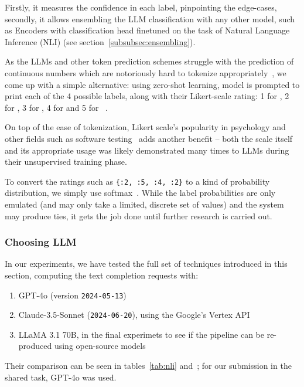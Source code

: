 Firstly, it measures the confidence in each label, pinpointing the edge-cases, secondly, it allows ensembling the LLM classification with any other model, such as Encoders with classification head finetuned on the task of Natural Language Inference (NLI) (see section~\ref{subsubsec:ensembling}).

As the LLMs and other token prediction schemes struggle with the prediction of continuous numbers which are notoriously hard to tokenize appropriately~\cite{golkar2023xvalcontinuousnumberencoding}, we come up with a simple alternative: using zero-shot learning, model is prompted to print each of the 4 possible labels, along with their Likert-scale rating: 1 for , 2 for , 3 for , 4 for  and 5 for ~\cite{likert1932technique}.

On top of the ease of tokenization, Likert scale's popularity in psychology and other fields such as software testing~\cite{likertstudy} adds another benefit -- both the scale itself and its appropriate usage was likely demonstrated many times to LLMs during their unsupervised training phase.

To convert the ratings such as \texttt{\{:2, :5, :4, :2\}} to a kind of probability distribution, we simply use softmax~\cite{NIPS1989_0336dcba}.
While the label probabilities are only emulated (and may only take a limited, discrete set of values) and the system may produce ties, it gets the job done until further research is carried out.

\subsubsection{Choosing LLM}
In our experiments, we have tested the full set of techniques introduced in this section, computing the text completion requests with:
\begin{enumerate}
    \item GPT-4o (version \texttt{2024-05-13})
    \item Claude-3.5-Sonnet (\texttt{2024-06-20}), using the Google's Vertex API
    \item LLaMA 3.1 70B, in the final experimets to see if the pipeline can be re-produced using open-source models
\end{enumerate} 

Their comparison can be seen in tables~\ref{tab:nli} and~; for our submission in the \averitec{}  shared task, GPT-4o was used.